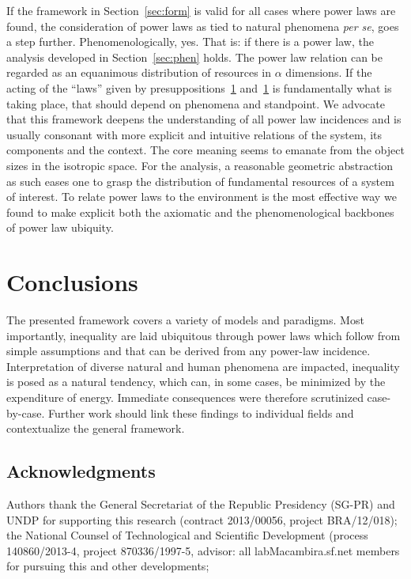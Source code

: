 \documentclass[a4paper, 11pt]{article} %
\begin{document}
If the framework in Section~\ref{sec:form} is valid for all cases where power laws are found,
the consideration of power laws as tied to natural phenomena \emph{per se}, goes a step further. Phenomenologically, yes. That is: if there is
a power law, the analysis developed in Section~\ref{sec:phen} holds.
The power law relation can be regarded as an equanimous distribution
of resources in $\alpha$ dimensions.
If the acting of the ``laws'' given by presuppositions~\ref{} and~\ref{} is fundamentally what is taking place, that should depend on phenomena
and standpoint.
We advocate that this framework deepens the understanding of all power law
incidences and is usually consonant with more explicit and intuitive 
relations of the system, its components and the context.
The core meaning seems to emanate from
the object sizes in the isotropic space.
For the analysis, a reasonable geometric abstraction as such
eases one to grasp the distribution
of fundamental resources of a system of interest.
To relate power laws to the environment is the most effective
way we found to make explicit both the axiomatic
and the phenomenological backbones of power law ubiquity.


\section{Conclusions}
The presented framework covers a variety of models and paradigms.
Most importantly, inequality are laid ubiquitous
through power laws which follow from simple assumptions
and that can be derived from any power-law incidence.
Interpretation of diverse natural and human phenomena 
are impacted, inequality is  posed as a natural tendency,
which can, in some cases, be minimized by the expenditure of energy.
Immediate consequences were therefore scrutinized case-by-case.
Further work should link these findings to individual fields
and contextualize the general framework.

\subsection*{Acknowledgments}
Authors thank
the General Secretariat of the Republic Presidency (SG-PR) and UNDP for supporting this
research (contract 2013/00056, project BRA/12/018); the National Counsel of Technological 
and Scientific Development (process 140860/2013-4, project 870336/1997-5,
advisor: 
all
labMacambira.sf.net members for pursuing this and other developments;

%
%



\end{document}
